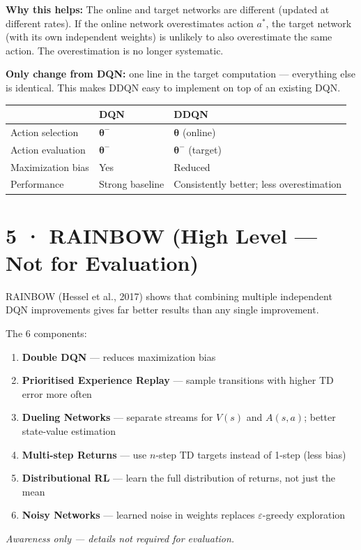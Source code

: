 \documentclass[11pt,a4paper]{article}
\begin{document}
\textbf{Why this helps:} The online and target networks are different (updated at different rates).
If the online network overestimates action $a^*$, the target network (with its own independent weights)
is unlikely to also overestimate the same action. The overestimation is no longer systematic.

\textbf{Only change from DQN:} one line in the target computation — everything else is identical.
This makes DDQN easy to implement on top of an existing DQN.

\begin{center}\small
\begin{tabular}{p{4cm}p{5cm}p{5cm}}
\toprule
& \textbf{DQN} & \textbf{DDQN} \\
\midrule
Action selection & $\boldsymbol{\theta}^{-}$ & $\boldsymbol{\theta}$ (online) \\
Action evaluation & $\boldsymbol{\theta}^{-}$ & $\boldsymbol{\theta}^{-}$ (target) \\
Maximization bias & Yes & Reduced \\
Performance & Strong baseline & Consistently better; less overestimation \\
\bottomrule
\end{tabular}
\end{center}

\section*{5 · RAINBOW (High Level — Not for Evaluation)}

\begin{tcolorbox}[note={RAINBOW — Combining 6 Improvements}]
RAINBOW (Hessel et al., 2017) shows that combining multiple independent DQN improvements
gives far better results than any single improvement.

\medskip
The 6 components:
\begin{enumerate}
  \item \textbf{Double DQN} — reduces maximization bias
  \item \textbf{Prioritised Experience Replay} — sample transitions with higher TD error more often
  \item \textbf{Dueling Networks} — separate streams for $V(s)$ and $A(s,a)$; better state-value estimation
  \item \textbf{Multi-step Returns} — use $n$-step TD targets instead of 1-step (less bias)
  \item \textbf{Distributional RL} — learn the full distribution of returns, not just the mean
  \item \textbf{Noisy Networks} — learned noise in weights replaces $\varepsilon$-greedy exploration
\end{enumerate}
\emph{Awareness only — details not required for evaluation.}
\end{tcolorbox}
\end{document}
